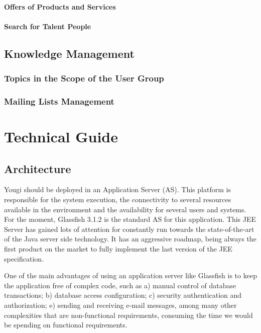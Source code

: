 \documentclass[envcountsame,envcountchap]{svmono}
\begin{document}
\subsection{Offers of Products and Services}

\subsection{Search for Talent People}

\chapter{Knowledge Management}

\section{Topics in the Scope of the User Group}

\section{Mailing Lists Management}

\part{Technical Guide}

\chapter{Architecture}

Yougi should be deployed in an Application Server (AS). This platform is responsible for the system execution, the connectivity to several resources available in the environment and the availability for several users and systems. For the moment, Glassfish 3.1.2 is the standard AS for this application. This JEE Server has gained lots of attention for constantly run towards the state-of-the-art of the Java server side technology. It has an aggressive roadmap, being always the first product on the market to fully implement the last version of the JEE specification.

One of the main advantages of using an application server like Glassfish is to keep the application free of complex code, such as a) manual control of database transactions; b) database access configuration; c) security authentication and authorization; e) sending and receiving e-mail messages, among many other complexities that are non-functional requirements, consuming the time we would be spending on functional requirements.
\end{document}
